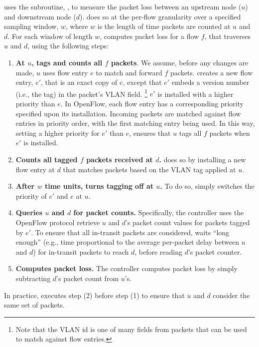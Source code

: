 \fl uses the subroutine, \pcnts, to measure the packet loss between an upstream node ($u$) and downstream node ($d$).  \pcnt does so at the per-flow granularity over a specified sampling window, $w$, 
where $w$ is the length of time packets are counted at $u$ and $d$. For each window of length $w$, \pcnt computes packet loss for a flow $f$, that traverses $u$ and $d$, using the following steps:
\begin{enumerate}
	\item 
	\textbf{At $u$, tags and counts all $f$ packets}.  
	We assume, before any changes are made, $u$ uses flow entry $e$ to match and forward $f$ packets.
	\pcnt creates a new flow entry, $e'$, that is an exact copy of $e$, except that $e'$ embeds a version number (i.e., the tag) in the packet's VLAN field.  
	\footnote{Note that the VLAN id is one of many fields from packets that can be used to match against flow entries. }
	$e'$ is installed with a higher priority than $e$.  In OpenFlow, each flow entry has a corresponding priority specified upon its installation.
	Incoming packets are matched against flow entries in priority order, with the first matching entry being used. 
	In this way, setting a higher priority for $e'$ than $e$, ensures that $u$ tags all $f$ packets when $e'$ is installed.

	\item
	\textbf{Counts all tagged $f$ packets received at $d$.} \pcnt does so by installing a new flow entry at $d$ that matches packets based on the VLAN tag applied at $u$.  

	\item 
	\textbf{After $w$ time units, turns tagging off at $u$.} To do so, \pcnt simply switches the priority of $e'$ and $e$ at $u$.

	\item
	\textbf{Queries $u$ and $d$ for packet counts.} 
	Specifically, the controller uses the OpenFlow protocol retrieve $u$ and $d$'s packet count values for packets tagged by $e'$.
	To ensure that all in-transit packets are considered, \pcnt waits ``long enough'' (e.g., time proportional to the average per-packet delay between $u$ and $d$) for in-transit packets to reach $d$, before reading $d$'s packet counter. 

	\item 
	\textbf{Computes packet loss.}
	The controller computes packet loss by simply subtracting $d$'s packet count from $u$'s. 

\end{enumerate}
In practice, \pcnt executes step (2) before step (1) to ensure that $u$ and $d$ consider the same set of packets.




